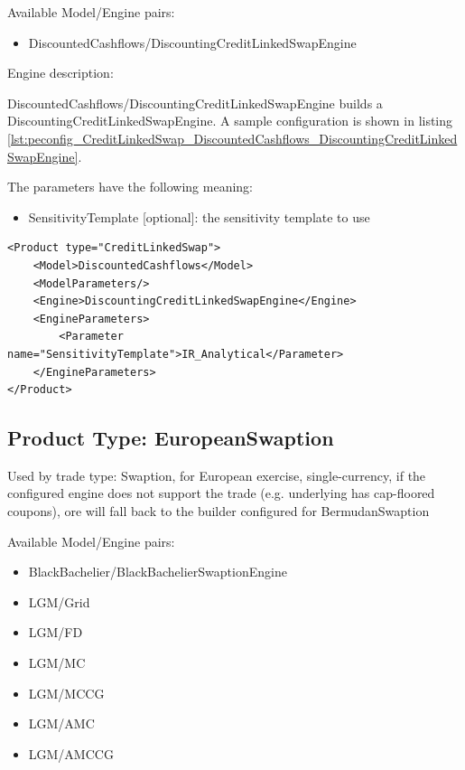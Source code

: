 Available Model/Engine pairs:

\begin{itemize}
\item DiscountedCashflows/DiscountingCreditLinkedSwapEngine
\end{itemize}

Engine description:

DiscountedCashflows/DiscountingCreditLinkedSwapEngine builds a DiscountingCreditLinkedSwapEngine. A sample configuration is shown
in listing \ref{lst:peconfig_CreditLinkedSwap_DiscountedCashflows_DiscountingCreditLinkedSwapEngine}.

The parameters have the following meaning:

\begin{itemize}
\item SensitivityTemplate [optional]: the sensitivity template to use
\end{itemize}

\begin{longlisting}
\begin{verbatim}
<Product type="CreditLinkedSwap">
    <Model>DiscountedCashflows</Model>
    <ModelParameters/>
    <Engine>DiscountingCreditLinkedSwapEngine</Engine>
    <EngineParameters>
        <Parameter name="SensitivityTemplate">IR_Analytical</Parameter>
    </EngineParameters>
</Product>
\end{verbatim}
\caption{Configuration for Product CreditLinkedSwap, Model DiscountedCashflows, Engine DiscountingCreditLinkedSwapEngine}
\label{lst:peconfig_CreditLinkedSwap_DiscountedCashflows_DiscountingCreditLinkedSwapEngine}
\end{longlisting}

\subsection{Product Type: EuropeanSwaption}
\label{sec:EuropeanSwaption_pt}
Used by trade type: Swaption, for European exercise, single-currency, if the configured engine does not support the
trade (e.g. underlying has cap-floored coupons), ore will fall back to the builder configured for BermudanSwaption

Available Model/Engine pairs:

\begin{itemize}
\item BlackBachelier/BlackBachelierSwaptionEngine
\item LGM/Grid
\item LGM/FD
\item LGM/MC
\item LGM/MCCG
\item LGM/AMC
\item LGM/AMCCG
\end{itemize}

